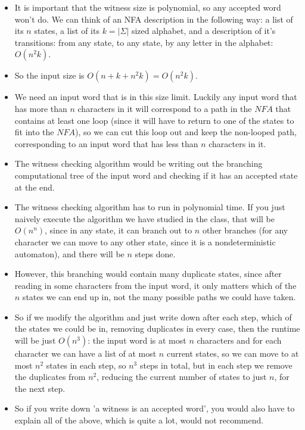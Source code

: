 \begin{itemize}
    \item It is important that the witness size is polynomial, so any accepted word won't do. We can think of an NFA description in the following way: a list of its $n$ states, a list of its $k=|\Sigma|$ sized alphabet, and a description of it's transitions: from any state, to any state, by any letter in the alphabet: $O(n^2k)$.
    \item So the input size is $O(n+k+n^2k)=O(n^2k)$.
    \item We need an input word that is in this size limit. Luckily any input word that has more than $n$ characters in it will correspond to a path in the $NFA$ that contains at least one loop (since it will have to return to one of the states to fit into the $NFA$), so we can cut this loop out and keep the non-looped path, corresponding to an input word that has less than $n$ characters in it.
    \item The witness checking algorithm would be writing out the branching computational tree of the input word and checking if it has an accepted state at the end.
    \item The witness checking algorithm has to run in polynomial time. If you just naively execute the algorithm we have studied in the class, that will be $O(n^n)$, since in any state, it can branch out to $n$ other branches (for any character we can move to any other state, since it is a nondeterministic automaton), and there will be $n$ steps done.
    \item However, this branching would contain many duplicate states, since after reading in some characters from the input word, it only matters which of the $n$ states we can end up in, not the many possible paths we could have taken.
    \item So if we modify the algorithm and just write down after each step, which of the states we could be in, removing duplicates in every case, then the runtime will be just $O(n^3)$: the input word is at most $n$ characters and for each character we can have a list of at most $n$ current states, so we can move to at most $n^2$ states in each step, so $n^3$ steps in total, but in each step we remove the duplicates from $n^2$, reducing the current number of states to just $n$, for the next step.
    \item So if you write down 'a witness is an accepted word', you would also have to explain all of the above, which is quite a lot, would not recommend.
\end{itemize}

